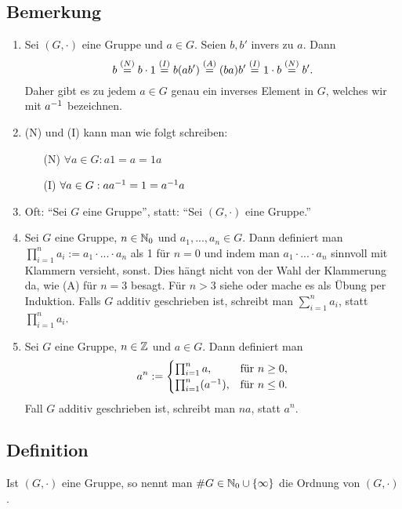 \subsection{Bemerkung}
	\begin{enumerate}[label=(\alph*)]
		\item
			Sei $(G, \cdot)$ eine Gruppe und $a \in G$. Seien $b, b'$ invers zu $a$. Dann
			$$b \stackrel{(N)}{=} b \cdot 1 \stackrel{(I)}{=} b(ab') \stackrel{(A)}{=} (ba)b' \stackrel{(I)}{=} 1 \cdot b \stackrel{(N)}{=} b'.$$
			Daher gibt es zu jedem $a \in G$ genau ein inverses Element in $G$, welches wir mit $a^{-1}$ bezeichnen.
			
		\item
			(N) und (I) kann man wie folgt schreiben:
			\begin{itemize}
				\item[(N)] $\forall a \in G : a1 = a = 1a$
				\item[(I)] $\forall a \in G : aa^{-1} = 1 = a^{-1} a$
			\end{itemize}
			
		\item
			Oft: "`Sei $G$ eine Gruppe"', statt: "`Sei $(G, \cdot)$ eine Gruppe."'
		
		\item
			Sei $G$ eine Gruppe, $n \in \mathbb N_0$ und $a_1, ..., a_n \in G$. Dann definiert man $\prod_{i=1}^n a_i := a_1 \cdot ... \cdot a_n$ als 1 für $n = 0$ und indem man $a_1 \cdot ... \cdot a_n$ sinnvoll mit Klammern versieht, sonst. Dies hängt nicht von der Wahl der Klammerung da, wie (A) für $n = 3$ besagt. Für $n > 3$ siehe  oder mache es als Übung per Induktion. Falls $G$ additiv geschrieben ist, schreibt man $\sum_{i=1}^n a_i$, statt $\prod_{i=1}^n a_i$.
			
		\item
			Sei $G$ eine Gruppe, $n \in \mathbb Z$ und $a \in G$. Dann definiert man
			$$a^n := \begin{cases}\prod_{i=1}^n a, & \text{für} ~ n \geq 0, \\ \prod_{i=1}^n (a^{-1}), & \text{für} ~ n \leq 0.\end{cases}$$
			Fall $G$ additiv geschrieben ist, schreibt man $na$, statt $a^n$.
	\end{enumerate}

\subsection{Definition} Ist $(G, \cdot)$ eine Gruppe, so nennt man $\#G \in \mathbb N_0 \cup \{\infty\}$ die Ordnung von $(G,\cdot)$.

